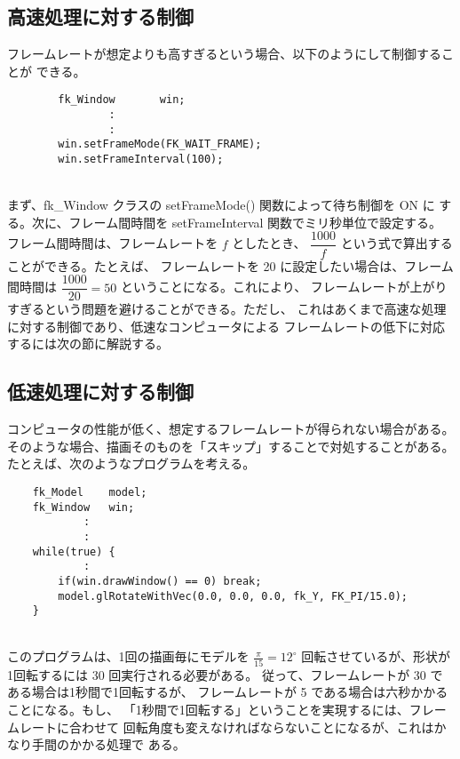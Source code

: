 \subsection{高速処理に対する制御} \label{sec:waitframe}
フレームレートが想定よりも高すぎるという場合、以下のようにして制御することが
できる。
\\
\begin{screen}
\begin{verbatim}
        fk_Window       win;
                :
                :
        win.setFrameMode(FK_WAIT_FRAME);
        win.setFrameInterval(100);
\end{verbatim}
\end{screen}
~ \\
まず、fk\_Window クラスの setFrameMode() 関数によって待ち制御を ON に
する。次に、フレーム間時間を setFrameInterval 関数でミリ秒単位で設定する。
フレーム間時間は、フレームレートを \(f\) としたとき、
\(\dfrac{1000}{f}\) という式で算出することができる。たとえば、
フレームレートを 20 に設定したい場合は、フレーム間時間は
\(\dfrac{1000}{20} = 50\) ということになる。これにより、
フレームレートが上がりすぎるという問題を避けることができる。ただし、
これはあくまで高速な処理に対する制御であり、低速なコンピュータによる
フレームレートの低下に対応するには次の節に解説する。

\subsection{低速処理に対する制御} \label{sec:skipframe}
コンピュータの性能が低く、想定するフレームレートが得られない場合がある。
そのような場合、描画そのものを「スキップ」することで対処することがある。
たとえば、次のようなプログラムを考える。
\\
\begin{breakbox}
\begin{verbatim}
    fk_Model    model;
    fk_Window   win;
            :
            :
    while(true) {
            :
        if(win.drawWindow() == 0) break;
        model.glRotateWithVec(0.0, 0.0, 0.0, fk_Y, FK_PI/15.0);
    }
\end{verbatim}
\end{breakbox}
~ \\
このプログラムは、1回の描画毎にモデルを \(\frac{\pi}{15} = 12^\circ\)
回転させているが、形状が1回転するには 30 回実行される必要がある。
従って、フレームレートが 30 である場合は1秒間で1回転するが、
フレームレートが 5 である場合は六秒かかることになる。もし、
「1秒間で1回転する」ということを実現するには、フレームレートに合わせて
回転角度も変えなければならないことになるが、これはかなり手間のかかる処理で
ある。

